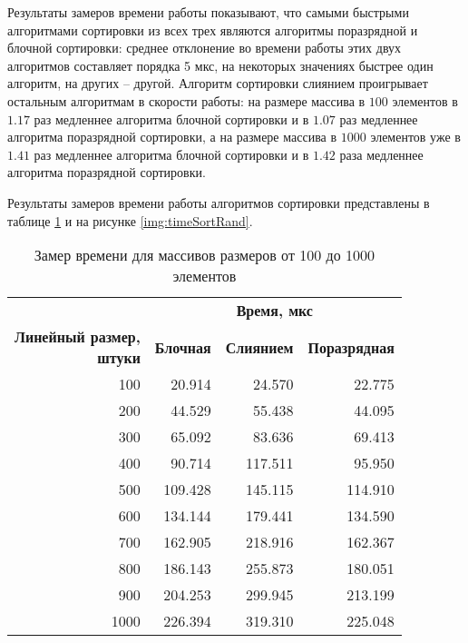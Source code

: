 Результаты замеров времени работы показывают, что самыми быстрыми алгоритмами сортировки из всех трех являются алгоритмы поразрядной и блочной сортировки: среднее отклонение во времени работы этих двух алгоритмов составляет порядка 5 мкс, на некоторых значениях быстрее один алгоритм, на других -- другой. 
Алгоритм сортировки слиянием проигрывает остальным алгоритмам в скорости работы: на размере массива в $100$ элементов в $1.17$ раз медленнее алгоритма блочной сортировки и в $1.07$ раз медленнее алгоритма поразрядной сортировки, а на размере массива в $1000$ элементов уже в $1.41$ раз медленнее алгоритма блочной сортировки и в $1.42$ раза медленнее алгоритма поразрядной сортировки.

Результаты замеров времени работы алгоритмов сортировки представлены в таблице \ref{tbl:timeRand} и на рисунке \ref{img:timeSortRand}.

\begin{table}[ht]
	\small
	\begin{center}
		\begin{threeparttable}
			\caption{Замер времени для массивов размеров от 100 до 1000 элементов}
			\label{tbl:timeRand}
			\begin{tabular}{|r|r|r|r|}
				\hline
				& \multicolumn{3}{c|}{\bfseries Время, мкс} \\ \cline{2-4}
				\bfseries \makecell{Линейный размер, \\ штуки} & \bfseries Блочная & \bfseries Слиянием & \bfseries Поразрядная \\ \cline{2-4}
				\hline
				100 & 20.914 & 24.570 & 22.775 \\
				\hline
				200 & 44.529 & 55.438 & 44.095 \\
				\hline
				300 & 65.092 & 83.636 & 69.413 \\
				\hline
				400 & 90.714 & 117.511 & 95.950 \\
				\hline
				500 & 109.428 & 145.115 & 114.910 \\
				\hline
				600 & 134.144 & 179.441 & 134.590 \\
				\hline
				700 & 162.905 & 218.916 & 162.367 \\
				\hline
				800 & 186.143 & 255.873 & 180.051 \\
				\hline
				900 & 204.253 & 299.945 & 213.199 \\
				\hline
				1000 & 226.394 & 319.310 & 225.048 \\
				\hline
			\end{tabular}	
		\end{threeparttable}
	\end{center}
\end{table}


